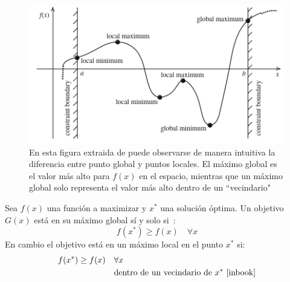 \begin{figure}[H]
    \begin{center}
        \includegraphics[width=1.2\textwidth]{imagenes/min-max_points.png}
    \end{center}
    \caption[Puntos globales y locales]{En esta figura extraida de \cite{inbook} puede observarse de manera intuitiva la diferencia entre punto global y puntos locales. El máximo global es el valor más alto para $f(x)$ en el espacio, mientras que un máximo global solo representa el valor más alto dentro de un ``vecindario"}
\end{figure}

Sea $f(x)$ una función a maximizar y $x^*$ una solución óptima. Un objetivo $G(x)$ está en su máximo global sí y solo si~\cite{inbook}:
\begin{equation}
    f(x^*) \geq f(x) \quad \forall x
\end{equation}
En cambio el objetivo está en un máximo local en el punto $x^*$ si:
\begin{equation}
    \begin{split}
        f(x^*) \geq f(x) \quad & \forall x \\
        & \text{dentro de un vecindario de } x^*\text{~\cite{inbook}}
    \end{split}
\end{equation}